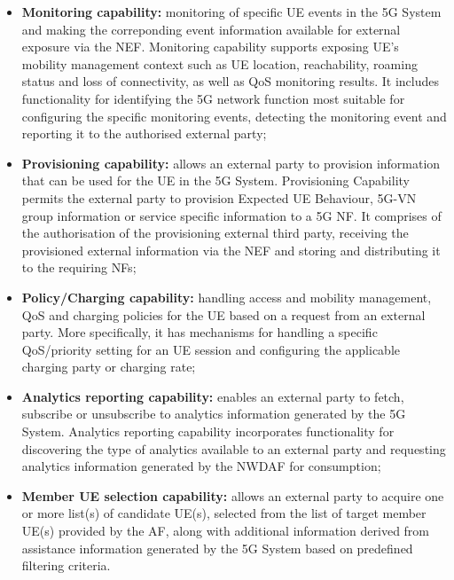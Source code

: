 \begin{itemize}
    \item \textbf{Monitoring capability:}  monitoring of specific \acs{UE} events in the \acs{5G} System and making the correponding event information available for external exposure via the \acs{NEF}. Monitoring capability supports exposing \acs{UE}'s mobility management context such as \acs{UE} location, reachability, roaming status and loss of connectivity, as well as \acs{QoS} monitoring results. It includes functionality for identifying the \acs{5G} network function most suitable for configuring the specific monitoring events, detecting the monitoring event and reporting it to the authorised external party;
    
    \item \textbf{Provisioning capability:} allows an external party to provision information that can be used for the \acs{UE} in the \acs{5G} System. Provisioning Capability permits the external party to provision Expected \acs{UE} Behaviour, \acs{5G-VN} group information or service specific information to a \acs{5G} \acs{NF}. It comprises of the authorisation of the provisioning external third party, receiving the provisioned external information via the \acs{NEF} and storing and distributing it to the requiring \acsp{NF};
    
    \item \textbf{Policy/Charging capability:}  handling access and mobility management, \acs{QoS} and charging policies for the \acs{UE} based on a request from an external party. More specifically, it has mechanisms for handling a specific \acs{QoS}/priority setting for an \acs{UE} session and configuring the applicable charging party or charging rate;
    
    \item \textbf{Analytics reporting capability:} enables an external party to fetch, subscribe or unsubscribe to analytics information generated by the \acs{5G} System. Analytics reporting capability incorporates functionality for discovering the type of analytics available to an external party and requesting analytics information generated by the \acs{NWDAF} for consumption;

    \item \textbf{Member \acs{UE} selection capability:} allows an external party to acquire one or more list(s) of candidate \acs{UE}(s), selected from the list of target member \acs{UE}(s) provided by the \acs{AF}, along with additional information derived from assistance information generated by the \acs{5G} System based on predefined filtering criteria.

\end{itemize}



